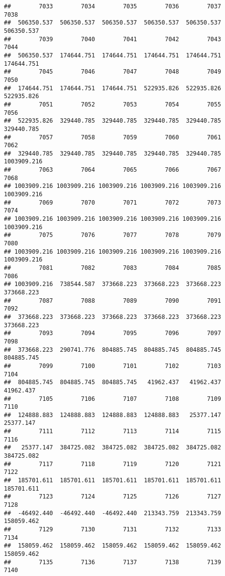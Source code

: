 \documentclass[
]{book}
\begin{document}
\begin{verbatim}
##        7033        7034        7035        7036        7037        7038 
##  506350.537  506350.537  506350.537  506350.537  506350.537  506350.537 
##        7039        7040        7041        7042        7043        7044 
##  506350.537  174644.751  174644.751  174644.751  174644.751  174644.751 
##        7045        7046        7047        7048        7049        7050 
##  174644.751  174644.751  174644.751  522935.826  522935.826  522935.826 
##        7051        7052        7053        7054        7055        7056 
##  522935.826  329440.785  329440.785  329440.785  329440.785  329440.785 
##        7057        7058        7059        7060        7061        7062 
##  329440.785  329440.785  329440.785  329440.785  329440.785 1003909.216 
##        7063        7064        7065        7066        7067        7068 
## 1003909.216 1003909.216 1003909.216 1003909.216 1003909.216 1003909.216 
##        7069        7070        7071        7072        7073        7074 
## 1003909.216 1003909.216 1003909.216 1003909.216 1003909.216 1003909.216 
##        7075        7076        7077        7078        7079        7080 
## 1003909.216 1003909.216 1003909.216 1003909.216 1003909.216 1003909.216 
##        7081        7082        7083        7084        7085        7086 
## 1003909.216  738544.587  373668.223  373668.223  373668.223  373668.223 
##        7087        7088        7089        7090        7091        7092 
##  373668.223  373668.223  373668.223  373668.223  373668.223  373668.223 
##        7093        7094        7095        7096        7097        7098 
##  373668.223  290741.776  804885.745  804885.745  804885.745  804885.745 
##        7099        7100        7101        7102        7103        7104 
##  804885.745  804885.745  804885.745   41962.437   41962.437   41962.437 
##        7105        7106        7107        7108        7109        7110 
##  124888.883  124888.883  124888.883  124888.883   25377.147   25377.147 
##        7111        7112        7113        7114        7115        7116 
##   25377.147  384725.082  384725.082  384725.082  384725.082  384725.082 
##        7117        7118        7119        7120        7121        7122 
##  185701.611  185701.611  185701.611  185701.611  185701.611  185701.611 
##        7123        7124        7125        7126        7127        7128 
##  -46492.440  -46492.440  -46492.440  213343.759  213343.759  158059.462 
##        7129        7130        7131        7132        7133        7134 
##  158059.462  158059.462  158059.462  158059.462  158059.462  158059.462 
##        7135        7136        7137        7138        7139        7140 

\end{verbatim}
\end{document}
